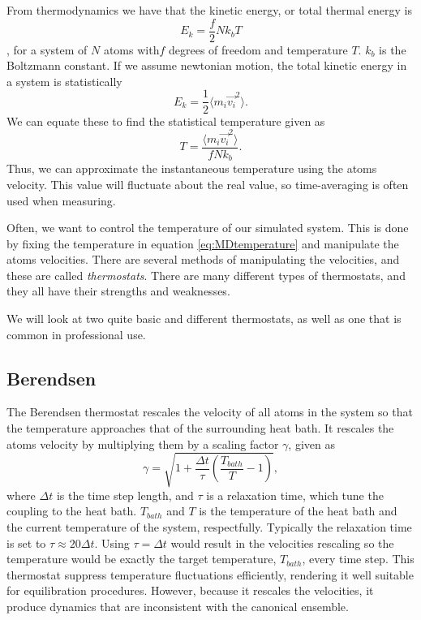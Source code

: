 \documentclass[twoside,english]{uiofysmaster}
\newcommand\lr[1]{\left(#1\right)}
\begin{document}
From thermodynamics
we have that the kinetic energy, or total thermal energy is 
\begin{equation}
	E_k = \frac{f}{2} Nk_bT 
\end{equation}
, for a system of $N$ atoms with$f$ degrees of freedom and temperature $T$.  
$k_b$ is the Boltzmann constant. 
If we assume newtonian motion, the total kinetic energy in a system is statistically 
\begin{equation}
    E_k = \frac{1}{2}\langle m_i \vec{v_i}^2\rangle.
\end{equation}
We can equate these to find the statistical temperature given as
\begin{equation}\label{eq:MDtemperature}
	T = \frac{\langle m_i \vec{v_i}^2\rangle}{fNk_b}.
\end{equation}
Thus, we can approximate the instantaneous temperature using the atoms velocity.
This value will fluctuate about the real value, so time-averaging is often used when measuring.

Often, we want to control the temperature of our simulated system.
This is done by fixing the temperature in equation \eqref{eq:MDtemperature} and manipulate the atoms velocities.
There are several methods of manipulating the velocities, and these are called \textit{thermostats}. 
There are many different types of thermostats, and they all have their strengths and weaknesses.

We will look at two quite basic and different thermostats, as well as one that is common in professional use.   


\subsection{Berendsen}
The Berendsen thermostat rescales the velocity of all atoms in the system so that the temperature approaches that of the surrounding heat bath.
It rescales the atoms velocity by multiplying them by a scaling factor $\gamma$, given as 
\begin{equation}
\gamma = \sqrt{1+\frac{\Delta t}{\tau}\lr{\frac{T_{bath}}{T}-1}},
\end{equation}
where $\Delta t$ is the time step length, and $\tau$ is a relaxation time, which tune the coupling to the heat bath. 
$T_{bath}$ and $T$ is the temperature of the heat bath and the current temperature of the system, respectfully.
Typically the relaxation time is set to $\tau \approx 20\Delta t$. 
Using $\tau = \Delta t$ would result in the velocities rescaling so the temperature would be exactly the target temperature, $T_{bath}$, every time step. 
This thermostat suppress temperature fluctuations efficiently, rendering it well suitable for equilibration procedures.
However, because it rescales the velocities, it produce dynamics that are inconsistent with the canonical ensemble.
\end{document}
